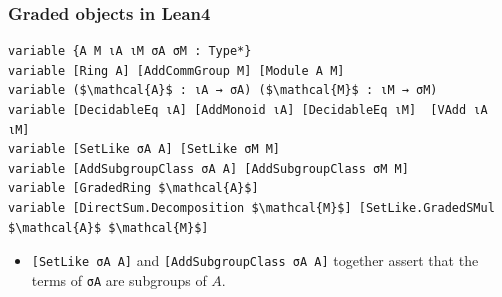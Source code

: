 \documentclass[9pt]{beamer}
\begin{document}
\begin{frame}[fragile]
\frametitle{Graded objects in Lean4}

\begin{lstlisting}[mathescape=true, extendedchars=true]
variable {A M ιA ιM σA σM : Type*} 
variable [Ring A] [AddCommGroup M] [Module A M]
variable ($\mathcal{A}$ : ιA → σA) ($\mathcal{M}$ : ιM → σM)
variable [DecidableEq ιA] [AddMonoid ιA] [DecidableEq ιM]  [VAdd ιA ιM]
variable [SetLike σA A] [SetLike σM M]
variable [AddSubgroupClass σA A] [AddSubgroupClass σM M] 
variable [GradedRing $\mathcal{A}$] 
variable [DirectSum.Decomposition $\mathcal{M}$] [SetLike.GradedSMul $\mathcal{A}$ $\mathcal{M}$]
\end{lstlisting}
\begin{itemize}
  \item \lstinline|[SetLike σA A]| and \lstinline|[AddSubgroupClass σA A]| together assert that the terms of \lstinline|σA| are subgroups of $A$.
\end{itemize}
\end{frame}
\end{document}
